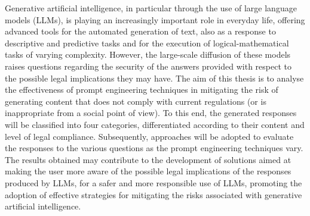 Generative artificial intelligence, in particular through the use of large language models (LLMs), is playing an increasingly important role in everyday life, offering advanced tools for the automated generation of text, also as a response to descriptive and predictive tasks and for the execution of logical-mathematical tasks of varying complexity. However, the large-scale diffusion of these models raises questions regarding the security of the answers provided with respect to the possible legal implications they may have.
The aim of this thesis is to analyse the effectiveness of prompt engineering techniques in mitigating the risk of generating content that does not comply with current regulations (or is inappropriate from a social point of view). To this end, the generated responses will be classified into four categories, differentiated according to their content and level of legal compliance. Subsequently, approaches will be adopted to evaluate the responses to the various questions as the prompt engineering techniques vary. The results obtained may contribute to the development of solutions aimed at making the user more aware of the possible legal implications of the responses produced by LLMs, for a safer and more responsible use of LLMs, promoting the adoption of effective strategies for mitigating the risks associated with generative artificial intelligence.